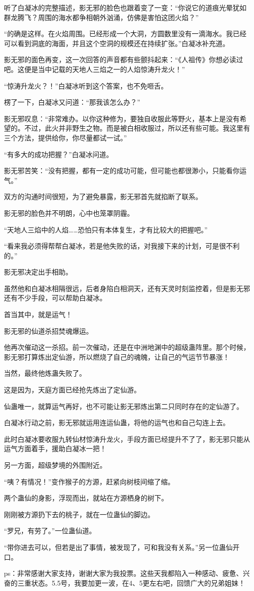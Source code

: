 \begin{this_body}
听了白凝冰的完整描述，影无邪的脸色也跟着变了一变：“你说它的道痕光晕犹如群龙腾飞？周围的海水都争相朝外汹涌，仿佛是害怕这团火焰？”

“的确是这样。在火焰周围。已经形成一个大洞，方圆数里没有一滴海水。我已经可以看到洞底的海面，并且这个空洞的规模还在持续扩张。”白凝冰补充道。

影无邪的面色再变，这一次回答的声音都有些颤抖起来：“《人祖传》你想必读过吧。这便是当中记载的天地人三焰之一的人焰惊涛升龙火！”

“惊涛升龙火？！”白凝冰听到这个答案，也不免咂舌。

楞了一下，白凝冰又问道：“那我该怎么办？”

影无邪叹息：“非常难办。以你这种修为，要独自收服此等野火，基本上是没有希望的。不过，此火并非野生之物。而是被白相收服过，所以还有些可能。我这里有三个方法，提供给你，你尽量都试一试。”

“有多大的成功把握？”白凝冰问道。

影无邪苦笑：“没有把握，都有一定的成功可能，但可能也都很渺小，只能看你运气。”

双方的沟通时间很短，为了避免暴露，影无邪首先就掐断了联系。

影无邪的脸色并不明朗，心中也笼罩阴霾。

“天地人三焰中的人焰……恐怕只有本体复生，才有比较大的把握吧。”

“看来我必须得帮帮白凝冰，若是他失败的话，对我接下来的计划，可是很不利的。”

影无邪决定出手相助。

虽然他和白凝冰相隔很远，后者身陷白相洞天，还有天灵时刻监控着，但是影无邪还有不少手段，可以帮助白凝冰。

首当其中，就是运气！

影无邪的仙道杀招焚魂爆运。

他再次催动这一杀招。前一次催动，还是在中洲地渊中的超级蛊阵里。那个时候，影无邪打算炼出定仙游，所以燃烧了自己的魂魄，让自己的气运节节暴涨！

当然，最终他炼蛊失败了。

这是因为，天庭方面已经抢先炼出了定仙游。

仙蛊唯一，就算运气再好，也不可能让影无邪炼出第二只同时存在的定仙游了。

白凝冰行动之前，影无邪就运用连运仙蛊，将他的运气也和自己勾连上去。

此时白凝冰要收服九转仙材惊涛升龙火，手段方面已经提升不了了，影无邪只能从运气方面着手，援助白凝冰一把！

另一方面，超级梦境的外围附近。

“咦？有情况！”变作猴子的方源，赶紧向树枝间缩了缩。

两个蛊仙的身影，浮现而出，就站在方源栖身的树下。

刚刚被方源扔下去的桃子，就在一位蛊仙的脚边。

“罗兄，有劳了。”一位蛊仙道。

“带你进去可以，但若是出了事情，被发现了，可和我没有关系。”另一位蛊仙开口。

ps：非常感谢大家支持，谢谢大家为我投票。这些天我都陷入一种感动、疲惫、兴奋的三重状态。5.5号，我要加更一波，在4、5更左右吧，回馈广大的兄弟姐妹！

\end{this_body}

